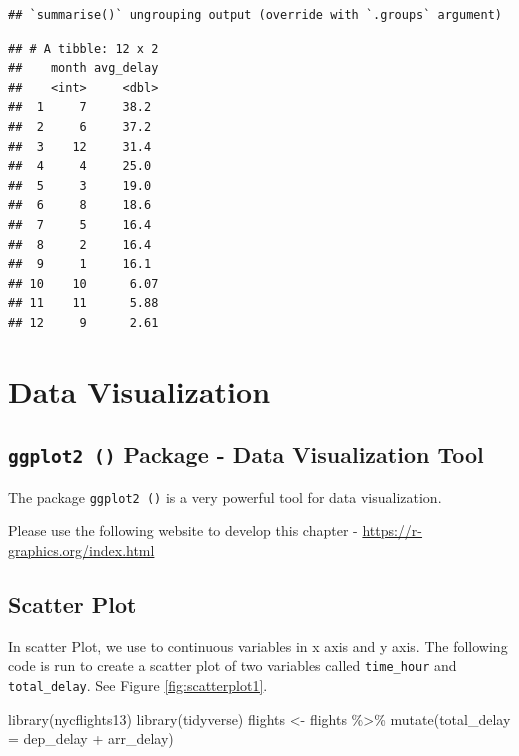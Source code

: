 \documentclass[
]{book}
\newenvironment{Shaded}{\begin{snugshade}}{\end{snugshade}}
\newcommand{\AttributeTok}[1]{\textcolor[rgb]{0.77,0.63,0.00}{#1}}
\newcommand{\FunctionTok}[1]{\textcolor[rgb]{0.00,0.00,0.00}{#1}}
\newcommand{\NormalTok}[1]{#1}
\newcommand{\OtherTok}[1]{\textcolor[rgb]{0.56,0.35,0.01}{#1}}
\newcommand{\SpecialCharTok}[1]{\textcolor[rgb]{0.00,0.00,0.00}{#1}}
\begin{document}
\begin{verbatim}
## `summarise()` ungrouping output (override with `.groups` argument)
\end{verbatim}

\begin{verbatim}
## # A tibble: 12 x 2
##    month avg_delay
##    <int>     <dbl>
##  1     7     38.2 
##  2     6     37.2 
##  3    12     31.4 
##  4     4     25.0 
##  5     3     19.0 
##  6     8     18.6 
##  7     5     16.4 
##  8     2     16.4 
##  9     1     16.1 
## 10    10      6.07
## 11    11      5.88
## 12     9      2.61
\end{verbatim}

\hypertarget{data-visualization}{%
\chapter{Data Visualization}\label{data-visualization}}

\hypertarget{ggplot2-package---data-visualization-tool}{%
\section{\texorpdfstring{\texttt{ggplot2\ ()} Package - Data Visualization Tool}{ggplot2 () Package - Data Visualization Tool}}\label{ggplot2-package---data-visualization-tool}}

The package \texttt{ggplot2\ ()} is a very powerful tool for data visualization.

Please use the following website to develop this chapter -
\url{https://r-graphics.org/index.html}

\hypertarget{scatter-plot}{%
\section{Scatter Plot}\label{scatter-plot}}

In scatter Plot, we use to continuous variables in x axis and y axis. The following code is run to create a scatter plot of two variables called \texttt{time\_hour} and \texttt{total\_delay}. See Figure \ref{fig:scatterplot1}.

\begin{Shaded}
\begin{Highlighting}[]
\FunctionTok{library}\NormalTok{(nycflights13)}
\FunctionTok{library}\NormalTok{(tidyverse)}
\NormalTok{flights }\OtherTok{\textless{}{-}}\NormalTok{ flights }\SpecialCharTok{\%\textgreater{}\%} 
  \FunctionTok{mutate}\NormalTok{(}\AttributeTok{total\_delay =}\NormalTok{ dep\_delay }\SpecialCharTok{+}\NormalTok{ arr\_delay)}
\end{Highlighting}
\end{Shaded}
\end{document}
